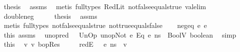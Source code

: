 \begin{isabellebody}
\ {\isacharquery}{\kern0pt}thesis\ \isamarkupfalse%
\ assms\ \isamarkupfalse%
\ {\isacharparenleft}{\kern0pt}metis\ {\isacharparenleft}{\kern0pt}full{\isacharunderscore}{\kern0pt}types{\isacharparenright}{\kern0pt}\ RedLit\ not{\isacharunderscore}{\kern0pt}false{\isacharunderscore}{\kern0pt}equals{\isacharunderscore}{\kern0pt}true\ val{\isacharunderscore}{\kern0pt}elim{\isacharparenright}{\kern0pt}\isanewline
{}\isamarkupfalse%
\isanewline
\ \ \isamarkupfalse%
\ double{\isacharunderscore}{\kern0pt}neg\isanewline
\ \ \isamarkupfalse%
\ \isamarkupfalse%
\ {\isacharquery}{\kern0pt}thesis\ \isamarkupfalse%
\ assms\ \isamarkupfalse%
\ {\isacharparenleft}{\kern0pt}metis\ {\isacharparenleft}{\kern0pt}full{\isacharunderscore}{\kern0pt}types{\isacharparenright}{\kern0pt}\ not{\isacharunderscore}{\kern0pt}false{\isacharunderscore}{\kern0pt}equals{\isacharunderscore}{\kern0pt}true\ not{\isacharunderscore}{\kern0pt}true{\isacharunderscore}{\kern0pt}equals{\isacharunderscore}{\kern0pt}false{\isacharparenright}{\kern0pt}\isanewline
{}\isamarkupfalse%
\isanewline
\ \ \isamarkupfalse%
\ {\isacharparenleft}{\kern0pt}neg{\isacharunderscore}{\kern0pt}eq\ e{}\ e{}{\isacharparenright}{\kern0pt}\isanewline
\ \ \isamarkupfalse%
\ this\ assms\ \isamarkupfalse%
\ unop{\isacharunderscore}{\kern0pt}red{\isacharcolon}{\kern0pt}\ {\isachardoublequoteopen}{\isasymLambda}{\isacharcomma}{\kern0pt}{\isasymGamma}{\isacharcomma}{\kern0pt}{\isasymOmega}\ {\isasymturnstile}\ {\isasymlangle}UnOp\ unop{\isachardot}{\kern0pt}Not\ {\isacharparenleft}{\kern0pt}e{}\ {\isasymguillemotleft}Eq{\isasymguillemotright}\ e{}{\isacharparenright}{\kern0pt}{\isacharcomma}{\kern0pt}\ ns{\isasymrangle}\ {\isasymDown}\ BoolV\ boolean{\isachardoublequoteclose}\ \isamarkupfalse%
\ simp\isanewline
\ \ \isamarkupfalse%
\ this\ \isamarkupfalse%
\ v{}\ v{}\ bopRes\ \isanewline
\ \ \ \ redE{}{\isacharcolon}{\kern0pt}\ {\isachardoublequoteopen}{\isasymLambda}{\isacharcomma}{\kern0pt}{\isasymGamma}{\isacharcomma}{\kern0pt}{\isasymOmega}\ {\isasymturnstile}\ {\isasymlangle}e{}{\isacharcomma}{\kern0pt}\ ns{\isasymrangle}\ {\isasymDown}\ v{}{\isachardoublequoteclose}\ \isanewline

\end{isabellebody}
